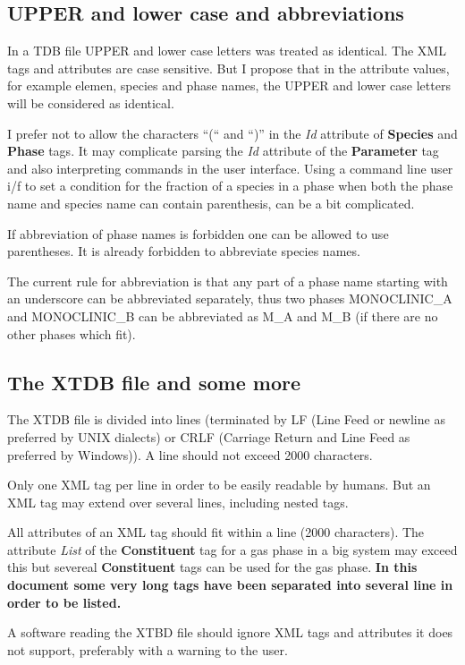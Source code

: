 \documentclass{article}
\begin{document}
\subsection{UPPER and lower case and abbreviations}

In a TDB file UPPER and lower case letters was treated as identical.
The XML tags and attributes are case sensitive.  But I propose that in
the attribute values, for example elemen, species and phase names, the
UPPER and lower case letters will be considered as identical.

I prefer not to allow the characters ``(`` and ``)'' in the {\em Id}
attribute of {\bf Species} and {\bf Phase} tags.  It may complicate
parsing the {\em Id} attribute of the {\bf Parameter} tag and also
interpreting commands in the user interface.  Using a command line
user i/f to set a condition for the fraction of a species in a phase
when both the phase name and species name can contain parenthesis, can
be a bit complicated.

If abbreviation of phase names is forbidden one can be allowed to use
parentheses.  It is already forbidden to abbreviate species names.

The current rule for abbreviation is that any part of a phase name
starting with an underscore can be abbreviated separately, thus two
phases MONOCLINIC\_A and MONOCLINIC\_B can be abbreviated as M\_A and
M\_B (if there are no other phases which fit).


\subsection{The XTDB file and some more}\label{sec:first}

The XTDB file is divided into lines (terminated by LF (Line Feed or
newline as preferred by UNIX dialects) or CRLF (Carriage Return and
Line Feed as preferred by Windows)).  A line should not exceed 2000
characters.

Only one XML tag per line in order to be easily readable by humans.
But an XML tag may extend over several lines, including nested tags.

All attributes of an XML tag should fit within a line (2000
characters).  The attribute {\em List} of the {\bf Constituent} tag
for a gas phase in a big system may exceed this but severeal {\bf
  Constituent} tags can be used for the gas phase.  {\bf In this document
some very long tags have been separated into several line in order to
be listed.}


A software reading the XTBD file should ignore XML tags and attributes
it does not support, preferably with a warning to the user.
\end{document}

